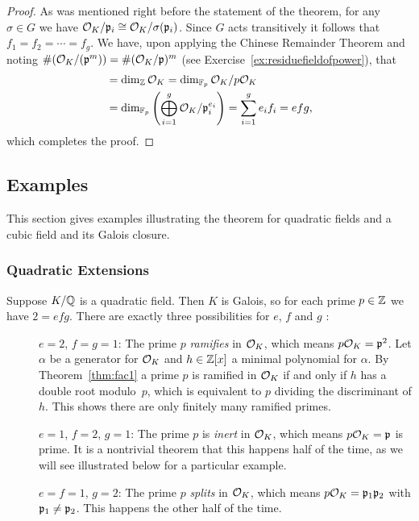 \begin{proof}
	As was mentioned right before the statement of the theorem,
	for any $\sigma\in G$ we have $\mathcal{O}_K/\mathfrak{p}_i\cong \mathcal{O}_K/\sigma(\mathfrak{p}_i)$.
	Since $G$ acts transitively it follows that $f_1=f_2=\cdots = f_g$.
	We have, upon applying the Chinese Remainder Theorem
	and noting $\#(\mathcal{O}_K/(\mathfrak{p}^m)) = \#(\mathcal{O}_K/\mathfrak{p})^m$
	(see Exercise~\ref{ex:residuefieldofpower}), that
	\begin{align*}
		[K:\Q]&= \dim_{\Z} \O_K = \dim_{\F_p} \O_K/p\O_K \\
		&= \dim_{\F_p} \left(\bigoplus_{i=1}^g \O_K/\p_i^{e_i}\right)
		= \sum_{i=1}^g e_i f_i
		= efg,
	\end{align*}
	which completes the proof.
\end{proof}

\subsection{Examples}

This section gives examples illustrating the theorem for quadratic fields
and a cubic field and its Galois closure.

\subsubsection{Quadratic Extensions}

Suppose $K/\mathbb{Q}$ is a quadratic field. 
Then $K$ is Galois, so for each prime $p\in\mathbb{Z}$ we have $2 = efg$.
There are exactly three possibilities for $e$, $f$ and $g$ :
\begin{description}
	\item[] $e=2$, $f=g=1$: The prime $p$ \emph{ramifies} in
	$\mathcal{O}_K$, which means $p\mathcal{O}_K = \mathfrak{p}^2$.  Let $\alpha$ be a generator for $\mathcal{O}_K$ and
	$h\in\mathbb{Z}[x]$ a minimal polynomial for $\alpha$.
	By Theorem~\ref{thm:fac1} a prime $p$ is ramified in $\mathcal{O}_K$ if and only if
	$h$ has a double root modulo~$p$, which is equivalent to $p$ dividing
	the discriminant of $h$. This shows there are only finitely many ramified
	primes.

	\item[] $e=1$, $f=2$, $g=1$: The prime $p$ is \emph{inert} in $\mathcal{O}_K$,
	which means $p\mathcal{O}_K = \mathfrak{p}$ is prime.  It is a nontrivial theorem that
	this happens half of the time,
	as we will see illustrated below for a particular example.

	\item[] $e=f=1$, $g=2$: The prime $p$ \emph{splits} in $\mathcal{O}_K$,
	which means $p\mathcal{O}_K = \mathfrak{p}_1\mathfrak{p}_2$ with $\mathfrak{p}_1\neq \mathfrak{p}_2$.  This happens the other
	half of the time.
\end{description}

